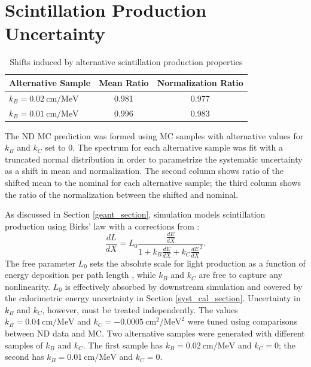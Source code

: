 {\begin{figure}
\end{figure}

\clearpage

\section{Scintillation Production Uncertainty}

\begin{table}
\begin{center}
\begin{tabular}{|l|c|c|}
\hline
\textbf{Alternative Sample} & \textbf{Mean Ratio} & \textbf{Normalization Ratio} \\ \hline
$k_B = 0.02~\text{cm} / \text{MeV}$ & 0.981 & 0.977  \\ \hline
$k_B = 0.01~\text{cm} / \text{MeV}$ & 0.996 & 0.983  \\ \hline
\end{tabular}
\end{center}
\caption{Shifts induced by alternative scintillation production properties}{
The ND MC prediction was formed using MC samples with alternative
values for $k_B$ and $k_C$ set to 0.
The spectrum for each alternative sample
was fit with a truncated normal distribution in order to
parametrize the systematic uncertainty as a shift in mean and normalization.
The second column shows ratio of the shifted mean to the nominal for each
alternative sample; the third column shows the ratio of the normalization
between the shifted and nominal.
}
\label{birks_shift_table}
\end{table}


As discussed in Section \ref{geant_section}, \nova simulation
models scintillation production using Birks' law \cite{birks1951scintillations}
with a corrections from \cite{chou1952nature}:
\begin{equation}
\frac{dL}{dX} = L_0  \frac{\frac{dE}{dX}}{1+ k_B \frac{dE}{dX} + k_C \frac{dE}{dX}^2}.
\end{equation}
The free parameter $L_0$ sets the absolute scale for light production
as a function of energy deposition per path length \dedx,
while $k_B$ and $k_C$ are free to capture any nonlinearity.
$L_0$ is effectively absorbed by downstream simulation and covered
by the calorimetric energy uncertainty in Section \ref{syst_cal_section}.
Uncertainty in $k_B$ and $k_C$, however, must be treated independently.
The values
 $k_B = 0.04~\text{cm} / \text{MeV}$ and $k_C = -0.0005~\text{cm}^2 / \text{MeV}^2$
were tuned using comparisons between ND data and MC.
Two alternative samples were generated with different samples of $k_B$ and
$k_C$.  The first sample has $k_B = 0.02~\text{cm} / \text{MeV}$ and $k_C = 0$;
the second has $k_B = 0.01~\text{cm} / \text{MeV}$ and $k_C = 0$.

}
